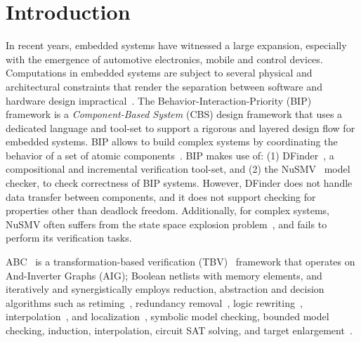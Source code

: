 \section{Introduction}
\label{sect-intro}

In recent years, embedded systems have witnessed a large expansion, especially with  the emergence of automotive electronics, mobile and control devices.
Computations in embedded systems are subject to several physical and architectural 
constraints that render the separation between software and hardware design impractical~\cite{henzinger2006embedded}.
The Behavior-Interaction-Priority (BIP) framework 
is a {\em Component-Based System} (CBS) design framework that uses a dedicated 
language and tool-set to support a rigorous and layered design flow for embedded systems.  
BIP allows to build complex systems by coordinating the behavior of a set of atomic components~\cite{BasuBBCJNS11}.
BIP makes use of: (1) DFinder~\cite{dfinder}, a compositional  
and incremental verification tool-set, and (2) the NuSMV~\cite{nusmv} model checker, to check correctness of BIP systems. 
However, DFinder \cite{BBL14} does not  handle data transfer between components, and it does not support checking for properties other than deadlock freedom. 
Additionally, for complex systems, NuSMV often suffers from the state space explosion 
problem~\cite{sipser2006introduction}, and fails to perform its verification tasks.

ABC~\cite{brayton2010abc} is a transformation-based 
verification (TBV)~\cite{kuehlmann2001transformation} framework that operates on And-Inverter Graphs (AIG); Boolean netlists with
memory elements, and iteratively and synergistically 
employs reduction, abstraction and decision algorithms such as 
retiming~\cite{KuBa01}, redundancy  removal~\cite{HmBPK05,KuMP01,BjesseC00,aziz-fmsd-00}, logic
rewriting~\cite{BjBo04}, interpolation~\cite{McMillan03}, 
and localization~\cite{Wang03}, symbolic model checking, bounded model checking, induction, interpolation,  circuit SAT solving, and target enlargement~\cite{MoGS00,MoMZ01,HoSH00,BaKuAb02,Hari05expert}.


